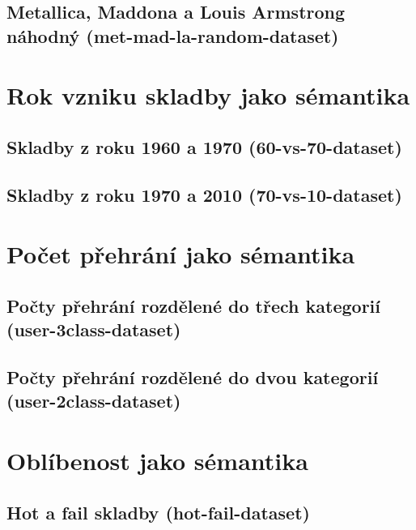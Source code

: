 \documentclass[thesis=M,czech]{FITthesis}[2012/06/26]
\begin{document}
\subsection{Metallica, Maddona a Louis Armstrong náhodný (met-mad-la-random-dataset)}\label{sec:met-mad-la-random-dataset}

\section{Rok vzniku skladby jako sémantika}

\subsection{Skladby z roku 1960 a 1970 (60-vs-70-dataset)}\label{sec:60-vs-70-dataset}

\subsection{Skladby z roku 1970 a 2010 (70-vs-10-dataset)}\label{sec:70-vs-10-dataset}

\section{Počet přehrání jako sémantika}

\subsection{Počty přehrání rozdělené do třech kategorií (user-3class-dataset)}\label{sec:user-3class-dataset}
\subsection{Počty přehrání rozdělené do dvou kategorií (user-2class-dataset)}\label{sec:user-2class-dataset}

\section{Oblíbenost jako sémantika}

\subsection{Hot a fail skladby (hot-fail-dataset)}\label{sec:hot-fail-dataset}



\end{document}
